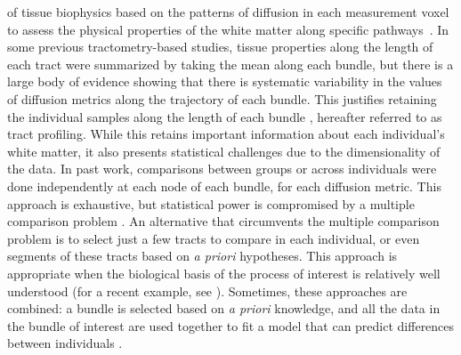 \documentclass[10pt,letterpaper]{article}
\begin{document}
of tissue biophysics based on the patterns of diffusion in each measurement
voxel to assess the physical properties of the white matter along specific
pathways~\cite{Jones2005-yq, Bells2011-cf}.
In some previous tractometry-based studies, tissue properties along the
length of each tract were summarized by taking the mean along each
bundle, but there is a large body of evidence showing that there is
systematic variability in the values of diffusion metrics along the
trajectory of each bundle. This justifies retaining the individual
samples along the length of each bundle
\cite{Jones2005-yq, yeatman2012tract, colby2012, ODonnell2009-uu},
hereafter referred to as tract profiling.
While this retains important information about each individual's white
matter, it also presents statistical challenges due to the dimensionality of
the data. In past work, comparisons between groups or across individuals were
done independently at each node of each bundle, for each
diffusion metric. This approach is exhaustive, but
statistical power is compromised by a multiple comparison problem
\cite{colby2012, Nichols2002-zu, Nichols2003-yy, chamberland2019dimensionality}.
An alternative that
circumvents the multiple comparison problem is to select just a few
tracts to compare in each individual, or even
segments of these tracts based on \emph{a priori} hypotheses. This
approach is appropriate when the biological basis of the process
of interest is relatively well understood (for a recent example, see
\cite{huber2018rapid}). Sometimes, these approaches are combined: a
bundle is selected based on \emph{a priori} knowledge, and all the data
in the bundle of interest are used together to fit a model that can
predict differences between individuals \cite{dayan2016profilometry}.
\end{document}
